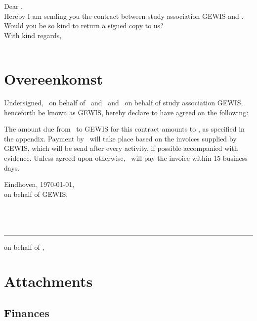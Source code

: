 \documentclass[
 digital,         %
 english         %
]{GEWISLetter}
\newcommand{\GEWIScontact}{%
\\%
}
\newcommand{\contractantOne}{%
}
\newcommand{\contractantTwo}{%
}
\newcommand{\COMPANYcontact}{%
}
\begin{document}
\GEWISfirstpage                 %
\printadresenkenmerk            %

Dear %
,\\[2\baselineskip]
Hereby I am sending you the contract between study association GEWIS and \GEWISRecipient . Would you be so kind to return a signed copy to us?
\\[2\baselineskip]

With kind regards,\\[2\baselineskip]
\GEWIScontact

\section{Overeenkomst}
Undersigned, \COMPANYcontact\ on behalf of \GEWISRecipient\, and \contractantOne\ and \contractantTwo\ on behalf of study association GEWIS, henceforth be known as GEWIS, hereby declare to have agreed on the following:
 \begin{itemize}
 \end{itemize}

The amount due from \GEWISRecipient\ to GEWIS for this contract amounts to %
, as specified in the appendix. Payment by \GEWISRecipient\ will take place based on the invoices supplied by GEWIS, which will be send after every activity, if possible accompanied with evidence. Unless agreed upon otherwise, \GEWISRecipient\ will pay the invoice within 15 business days.
\\[2\baselineskip]

\begin{minipage}[t]{0.4\textwidth}
Eindhoven, \today,\\
on behalf of GEWIS,
\\[3\baselineskip]
\\
\\[3\baselineskip]
\\
\end{minipage}
\hfill
\begin{minipage}[t]{0.4\textwidth}
\rule{\textwidth}{0.4pt}
on behalf of \GEWISRecipient,\\[3\baselineskip]
\COMPANYcontact
\end{minipage}


\section{Attachments}

\subsection{Finances}
\end{document}

